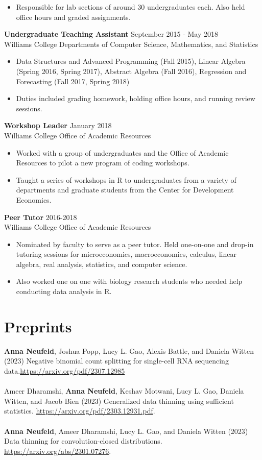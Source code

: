 \documentclass[margin, 10pt]{res} %
\begin{document}
\begin{resume}
\begin{itemize}
\item Responsible for lab sections of around 30 undergraduates each. Also held office hours and graded assignments.
\end{itemize}
{\textbf{Undergraduate Teaching Assistant}} \hfill September 2015 - May 2018 \\
Williams College Departments of Computer Science, Mathematics, and Statistics
\begin{itemize}
\item Data Structures and Advanced Programming (Fall 2015), Linear Algebra (Spring 2016, Spring 2017), Abstract Algebra (Fall 2016), Regression and Forecasting (Fall 2017, Spring 2018)
\item Duties included grading homework, holding office hours, and running review sessions. 
\end{itemize}
{\textbf{Workshop Leader}} \hfill January 2018 \\
Williams College Office of Academic Resources
\begin{itemize}
\item Worked with a group of undergraduates and the Office of Academic Resources to pilot a new program of coding workshops.
\item Taught a series of workshops in R to undergraduates from a variety of departments and graduate students from the Center for Development Economics. 
\end{itemize}
{\textbf{Peer Tutor}} \hfill 2016-2018 \\
Williams College Office of Academic Resources
\begin{itemize}
\item Nominated by faculty to serve as a peer tutor. Held one-on-one and drop-in tutoring sessions for microeconomics, macroeconomics, calculus, linear algebra, real analysis, statistics, and computer science.  
\item Also worked one on one with biology research students who needed help conducting data analysis in R. 
\end{itemize}

\section{Preprints} 
\textbf{Anna Neufeld}, Joshua Popp, Lucy L. Gao, Alexis Battle, and Daniela Witten (2023) Negative binomial count splitting for single-cell RNA sequencing data.\href{https://arxiv.org/pdf/2307.12985}{https://arxiv.org/pdf/2307.12985} \\
\\
Ameer Dharamshi, \textbf{Anna Neufeld}, Keshav Motwani, Lucy L. Gao, Daniela Witten, and Jacob Bien (2023) Generalized data thinning using sufficient statistics. \href{https://arxiv.org/pdf/2303.12931.pdf}{https://arxiv.org/pdf/2303.12931.pdf}.  \\
\\
\textbf{Anna Neufeld}, Ameer Dharamshi, Lucy L. Gao, and Daniela Witten (2023) Data thinning for convolution-closed distributions. \href{https://arxiv.org/abs/2301.07276}{https://arxiv.org/abs/2301.07276}. 

\end{resume}
\end{document}
